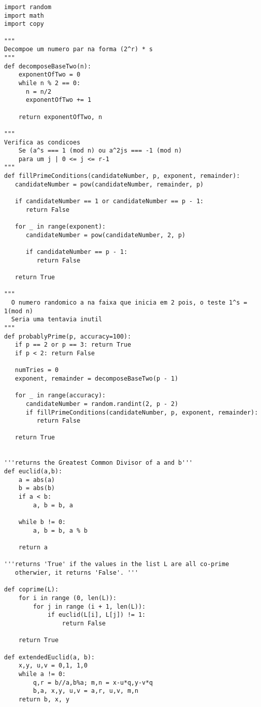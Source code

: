 \documentclass[a4paper,11pt]{article}
\theoremstyle{mytheor}
\begin{document}
\begin{lstlisting}[caption=RSA utilizando Miller Rabin em Python.]
import random
import math
import copy

"""
Decompoe um numero par na forma (2^r) * s
"""
def decomposeBaseTwo(n):
    exponentOfTwo = 0
    while n % 2 == 0:
      n = n/2
      exponentOfTwo += 1
 
    return exponentOfTwo, n

"""
Verifica as condicoes
    Se (a^s === 1 (mod n) ou a^2js === -1 (mod n) 
    para um j | 0 <= j <= r-1
"""
def fillPrimeConditions(candidateNumber, p, exponent, remainder):
   candidateNumber = pow(candidateNumber, remainder, p)
 
   if candidateNumber == 1 or candidateNumber == p - 1:
      return False
 
   for _ in range(exponent):
      candidateNumber = pow(candidateNumber, 2, p)
 
      if candidateNumber == p - 1:
         return False
 
   return True
 
"""
  O numero randomico a na faixa que inicia em 2 pois, o teste 1^s = 1(mod n)
  Seria uma tentavia inutil
"""
def probablyPrime(p, accuracy=100):
   if p == 2 or p == 3: return True
   if p < 2: return False
 
   numTries = 0
   exponent, remainder = decomposeBaseTwo(p - 1)
 
   for _ in range(accuracy):
      candidateNumber = random.randint(2, p - 2)
      if fillPrimeConditions(candidateNumber, p, exponent, remainder):
         return False
 
   return True


'''returns the Greatest Common Divisor of a and b'''
def euclid(a,b):
    a = abs(a)
    b = abs(b)
    if a < b:
        a, b = b, a

    while b != 0:
        a, b = b, a % b

    return a

'''returns 'True' if the values in the list L are all co-prime
   otherwier, it returns 'False'. '''

def coprime(L):
    for i in range (0, len(L)):
        for j in range (i + 1, len(L)):
            if euclid(L[i], L[j]) != 1:
                return False

    return True

def extendedEuclid(a, b):
    x,y, u,v = 0,1, 1,0
    while a != 0:
        q,r = b//a,b%a; m,n = x-u*q,y-v*q
        b,a, x,y, u,v = a,r, u,v, m,n
    return b, x, y


\end{lstlisting}
\end{document}
